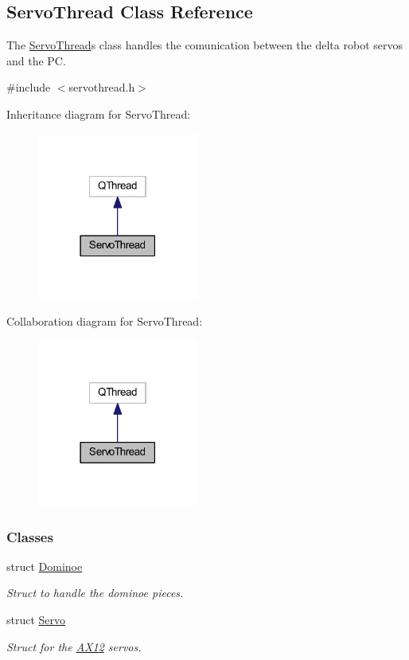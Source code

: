 \hypertarget{a00009}{}\subsection{Servo\+Thread Class Reference}
\label{a00009}


The \hyperlink{a00009}{Servo\+Thread}\textquotesingle{}s class handles the comunication between the delta robot servos and the P\+C.  




{\ttfamily \#include $<$servothread.\+h$>$}



Inheritance diagram for Servo\+Thread\+:\nopagebreak
\begin{figure}[H]
\begin{center}
\leavevmode
\includegraphics[width=150pt]{d6/d42/a00043}
\end{center}
\end{figure}


Collaboration diagram for Servo\+Thread\+:\nopagebreak
\begin{figure}[H]
\begin{center}
\leavevmode
\includegraphics[width=150pt]{d5/df9/a00044}
\end{center}
\end{figure}
\subsubsection*{Classes}
\begin{DoxyCompactItemize}
\item 
struct \hyperlink{a00002}{Dominoe}
\begin{DoxyCompactList}\small\item\em Struct to handle the dominoe pieces. \end{DoxyCompactList}\item 
struct \hyperlink{a00007}{Servo}
\begin{DoxyCompactList}\small\item\em Struct for the \hyperlink{a00001}{A\+X12} servos. \end{DoxyCompactList}\end{DoxyCompactItemize}
